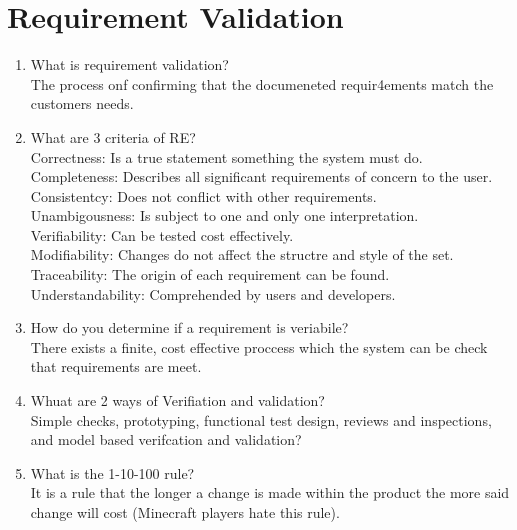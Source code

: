 \documentclass[10pt]{article}
\begin{document}
\section{Requirement Validation}
\begin{enumerate}
      \item What is requirement validation?\\
            The process onf confirming that the documeneted requir4ements match the customers needs.\\

      \item What are 3 criteria of RE?\\
            Correctness: Is a true statement something the system must do.\\
            Completeness: Describes all significant requirements of concern to the user.\\
            Consistentcy: Does not conflict with other requirements.\\
            Unambigousness: Is subject to one and only one interpretation.\\
            Verifiability: Can be tested cost effectively.\\
            Modifiability: Changes do not affect the structre and style of the set.\\
            Traceability: The origin of each requirement can be found.\\
            Understandability: Comprehended by users and developers.\\

      \item How do you determine if a requirement is veriabile?\\
            There exists a finite, cost effective proccess which the system can be check that requirements are meet.\\

      \item Whuat are 2 ways of Verifiation and validation?\\
            Simple checks, prototyping, functional test design, reviews and inspections, and model based verifcation and validation?\\

      \item What is the 1-10-100 rule?\\
            It is a rule that the longer a change is made within the product the more said change will cost (Minecraft players hate this rule).\\


\end{enumerate}
\end{document}
